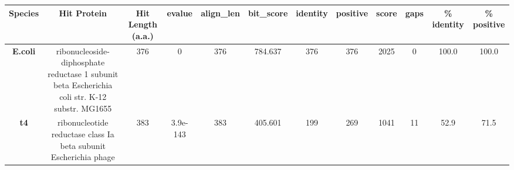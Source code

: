 \begin{tabular}{|c|c|c|c|c|c|c|c|c|c|c|c|} \hline
\textbf{Species} & \textbf{Hit Protein} & \textbf{Hit Length (a.a.)} & \textbf{evalue} & \textbf{align\_len} & \textbf{bit\_score} & \textbf{identity} & \textbf{positive} & \textbf{score} & \textbf{gaps} & \textbf{\% identity} & \textbf{\% positive} \\ \hline
\textbf{E.coli} & ribonucleoside-diphosphate reductase 1 subunit beta Escherichia coli str. K-12 substr. MG1655 & 376 & 0 & 376 & 784.637 & 376 & 376 & 2025 & 0 & 100.0 & 100.0\\
\textbf{t4} & ribonucleotide reductase class Ia beta subunit Escherichia phage  & 383 & 3.9e-143 & 383 & 405.601 & 199 & 269 & 1041 & 11 & 52.9 & 71.5\\
\hline \end{tabular}

